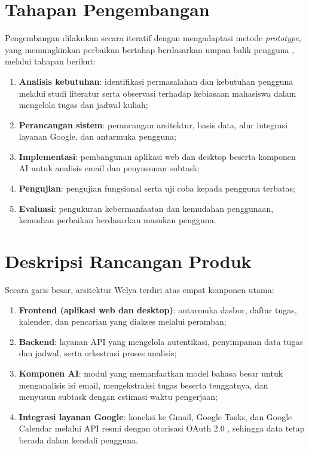 \section{Tahapan Pengembangan}
Pengembangan dilakukan secara iteratif dengan mengadaptasi metode
\emph{prototype}, yang memungkinkan perbaikan bertahap berdasarkan umpan
balik pengguna \parencite{aprilisa2024}, melalui tahapan berikut:
\begin{enumerate}
  \item \textbf{Analisis kebutuhan}: identifikasi permasalahan dan
    kebutuhan pengguna melalui studi literatur serta observasi terhadap
    kebiasaan mahasiswa dalam mengelola tugas dan jadwal kuliah;
  \item \textbf{Perancangan sistem}: perancangan arsitektur, basis data,
    alur integrasi layanan Google, dan antarmuka pengguna;
  \item \textbf{Implementasi}: pembangunan aplikasi web dan desktop beserta
    komponen AI untuk analisis email dan penyusunan subtask;
  \item \textbf{Pengujian}: pengujian fungsional serta uji coba kepada
    pengguna terbatas;
  \item \textbf{Evaluasi}: pengukuran kebermanfaatan dan kemudahan
    penggunaan, kemudian perbaikan berdasarkan masukan pengguna.
\end{enumerate}

\section{Deskripsi Rancangan Produk}
Secara garis besar, arsitektur Welya terdiri atas empat komponen utama:
\begin{enumerate}
  \item \textbf{Frontend (aplikasi web dan desktop)}: antarmuka dasbor,
    daftar tugas,
    kalender, dan pencarian yang diakses melalui peramban;
  \item \textbf{Backend}: layanan API yang mengelola autentikasi,
    penyimpanan data tugas dan jadwal, serta orkestrasi proses analisis;
  \item \textbf{Komponen AI}: modul yang memanfaatkan model bahasa besar
    untuk menganalisis isi email, mengekstraksi tugas beserta tenggatnya,
    dan menyusun subtask dengan estimasi waktu pengerjaan;
  \item \textbf{Integrasi layanan Google}: koneksi ke Gmail, Google
    Tasks, dan Google Calendar melalui API resmi dengan otorisasi OAuth
    2.0 \parencite{arianto2025}, sehingga data tetap berada dalam kendali
    pengguna.
\end{enumerate}

